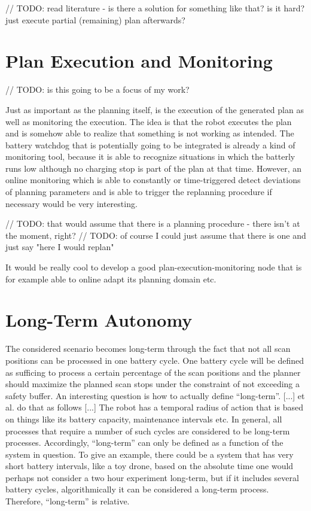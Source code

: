 \documentclass[german, master, expose, latin1]{base/thesis_KBS}
\begin{document}
// TODO: read literature - is there a solution for something like that? is it hard? just execute partial (remaining) plan afterwards?

\section{Plan Execution and Monitoring}

// TODO: is this going to be a focus of my work?\newline

Just as important as the planning itself, is the execution of the generated plan as well as monitoring the execution.
The idea is that the robot executes the plan and is somehow able to realize that something is not working as intended. 
The battery watchdog that is potentially going to be integrated is already a kind of monitoring tool, because it is able to recognize situations 
in which the batterly runs low although no charging stop is part of the plan at that time. However, an online monitoring which is able to constantly or time-triggered 
detect deviations of planning parameters and is able to trigger the replanning procedure if necessary would be very interesting.\newline

// TODO: that would assume that there is a planning procedure - there isn't at the moment, right?\newline
// TODO: of course I could just assume that there is one and just say "here I would replan"\newline

It would be really cool to develop a good plan-execution-monitoring node that is for example able to online adapt its planning domain etc.

\section{Long-Term Autonomy}

The considered scenario becomes long-term through the fact that not all scan positions can be processed in one battery cycle.
One battery cycle will be defined as sufficing to process a certain percentage of the scan positions and the planner should maximize the planned scan stops under the
constraint of not exceeding a safety buffer. \newline
An interesting question is how to actually define ``long-term''. [...] et al. do that as follows [...] The robot has a temporal radius of action that is based
on things like its battery capacity, maintenance intervals etc. In general, all processes that require a number of such cycles are considered to be long-term processes.
Accordingly, ``long-term'' can only be defined as a function of the system in question. To give an example, there could be a system that has very short battery intervals,
like a toy drone, based on the absolute time one would perhaps not consider a two hour experiment long-term, but if it includes several battery cycles, algorithmically
it can be considered a long-term process. Therefore, ``long-term'' is relative.
\end{document}
